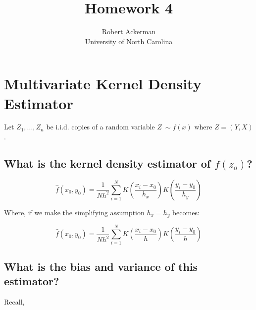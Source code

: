 \documentclass[11pt]{article}
\title{Homework 4}
\author{Robert Ackerman \\ University of North Carolina}
\theoremstyle{definition}
\begin{document}
\maketitle


\section{Multivariate Kernel Density Estimator}

Let $Z_1, ..., Z_n$ be i.i.d. copies of a random variable $Z ~ \sim f(x)$ where $Z = (Y, X)$.\\

\subsection{ What is the kernel density estimator of $f(z_o)$?}

\begin{equation*}
\hat{f}(x_{0}, y_{0}) = \frac{1}{Nh^{2}} \sum_{i=1}^N K\left(\frac{x_i - x_{0}}{h_{x}}\right) K\left(\frac{y_i - y_{0}}{h_{y}}\right)
\end{equation*}

\noindent
Where, if we make the simplifying assumption $h_{x}=h_{y}$ becomes:

\begin{equation}
\hat{f}(x_{0}, y_{0}) = \frac{1}{Nh^{2}} \sum_{i=1}^N K\left(\frac{x_i - x_{0}}{h}\right) K\left(\frac{y_i - y_{0}}{h}\right)
\end{equation}


\subsection{ What is the bias and variance of this estimator?}
Recall,
\end{document}
